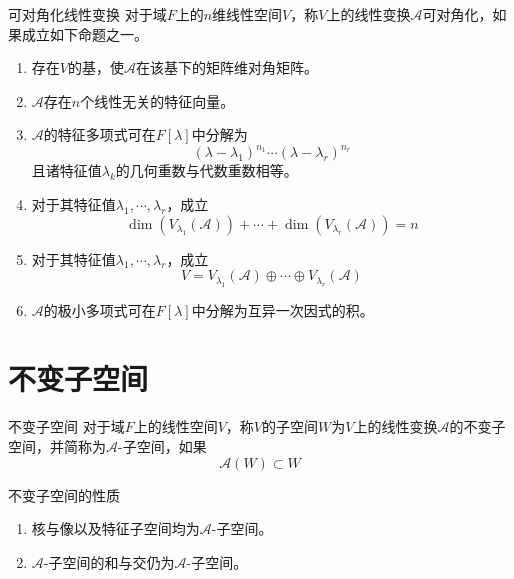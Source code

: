 \documentclass[lang = cn, scheme = chinese, thmcnt = section]{elegantbook}
\newcommand{\sub}{\subset}             %
\begin{document}
\begin{definition}{可对角化线性变换}
	对于域$F$上的$n$维线性空间$V$，称$V$上的线性变换$\mathscr{A}$可对角化，如果成立如下命题之一。
	\begin{enumerate}
		\item 存在$V$的基，使$\mathscr{A}$在该基下的矩阵维对角矩阵。
		\item $\mathscr{A}$存在$n$个线性无关的特征向量。
		\item $\mathscr{A}$的特征多项式可在$F[\lambda]$中分解为%
		$$
		(\lambda-\lambda_1)^{n_1}\cdots(\lambda-\lambda_r)^{n_r}
		$$
		且诸特征值$\lambda_k$的几何重数与代数重数相等。
		\item 对于其特征值$\lambda_1,\cdots,\lambda_r$，成立
		$$
		\dim (V_{\lambda_1}(\mathscr{A}))+\cdots+\dim (V_{\lambda_r}(\mathscr{A}))=n
		$$
		\item 对于其特征值$\lambda_1,\cdots,\lambda_r$，成立
		$$
		V=V_{\lambda_1}(\mathscr{A})\oplus\cdots\oplus V_{\lambda_r}(\mathscr{A})
		$$
		\item $\mathscr{A}$的极小多项式可在$F[\lambda]$中分解为互异一次因式的积。
	\end{enumerate}
\end{definition}

\section{不变子空间}

\begin{definition}{不变子空间}
	对于域$F$上的线性空间$V$，称$V$的子空间$W$为$V$上的线性变换$\mathscr{A}$的不变子空间，并简称为$\mathscr{A}$-子空间，如果%
	$$
	\mathscr{A}(W)\sub W
	$$
\end{definition}

\begin{proposition}{不变子空间的性质}
	\begin{enumerate}
		\item 核与像以及特征子空间均为$\mathscr{A}$-子空间。
		\item $\mathscr{A}$-子空间的和与交仍为$\mathscr{A}$-子空间。
	\end{enumerate}
\end{proposition}
\end{document}
